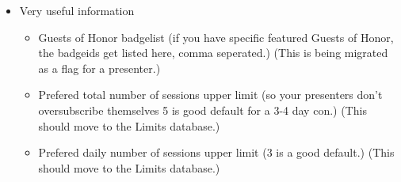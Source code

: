 \documentclass[tablesignature]{scrartcl}
\begin{document}
\begin{itemize}
\item Very useful information
\label{sec-1_2_4_3}%
\begin{itemize}
\item Guests of Honor badgelist (if you have specific featured Guests
       of Honor, the badgeids get listed here, comma seperated.)
       (This is being migrated as a flag for a presenter.)
\item Prefered total number of sessions upper limit (so your
       presenters don't oversubscribe themselves 5 is good default for
       a 3-4 day con.) (This should move to the Limits database.)
\item Prefered daily number of sessions upper limit (3 is a good
       default.) (This should move to the Limits database.)
\end{itemize}



\end{itemize}
\end{document}
